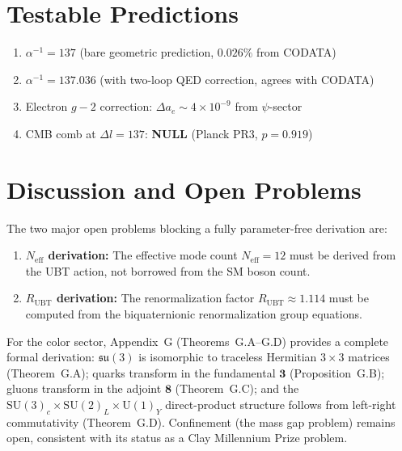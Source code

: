 \documentclass[12pt,a4paper]{article}
\begin{document}
\section{Testable Predictions}
\label{sec:predictions}

\begin{enumerate}
  \item $\alpha^{-1} = 137$ (bare geometric prediction, $0.026\%$ from CODATA)
  \item $\alpha^{-1} = 137.036$ (with two-loop QED correction, agrees with CODATA)
  \item Electron $g-2$ correction: $\Delta a_e \sim 4\times10^{-9}$ from $\psi$-sector
  \item CMB comb at $\Delta l = 137$: \textbf{NULL} (Planck PR3, $p = 0.919$)
\end{enumerate}

\section{Discussion and Open Problems}
\label{sec:discussion}

The two major open problems blocking a fully parameter-free derivation are:
\begin{enumerate}
  \item \textbf{$N_\text{eff}$ derivation:} The effective mode count $N_\text{eff} = 12$
    must be derived from the UBT action, not borrowed from the SM boson count.
  \item \textbf{$R_\text{UBT}$ derivation:} The renormalization factor
    $R_\text{UBT} \approx 1.114$ must be computed from the biquaternionic
    renormalization group equations.
\end{enumerate}

For the color sector, Appendix~G (Theorems~G.A--G.D) provides a complete formal derivation:
$\mathfrak{su}(3)$ is isomorphic to traceless Hermitian $3\times3$ matrices (Theorem~G.A);
quarks transform in the fundamental $\mathbf{3}$ (Proposition~G.B);
gluons transform in the adjoint $\mathbf{8}$ (Theorem~G.C);
and the $\mathrm{SU}(3)_c\times\mathrm{SU}(2)_L\times\mathrm{U}(1)_Y$ direct-product structure
follows from left-right commutativity (Theorem~G.D).
Confinement (the mass gap problem) remains open, consistent with its status as a Clay
Millennium Prize problem.
\end{document}
